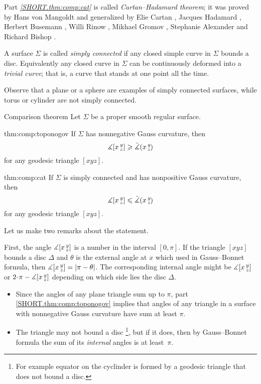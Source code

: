 Part \textit{\ref{SHORT.thm:comp:cat}} is called \emph{Cartan--Hadamard theorem};
it was proved by 
Hans von Mangoldt \cite{mangoldt} and generalized by Elie Cartan \cite{cartan}, Jacques Hadamard \cite{hadamard},
Herbert Busemann \cite{busemann},
Willi Rinow \cite{rinow},
Mikhael Gromov \cite[p.~119]{gromov},
Stephanie Alexander and Richard Bishop \cite{a-b:h-c}.

A surface $\Sigma$ is called \emph{simply connected} if any closed simple curve in $\Sigma$ bounds a disc.
Equivalently any closed curve in $\Sigma$ can be continuously deformed into a \emph{trivial curve}; that is, a curve that stands at one point all the time.

Observe that a plane or a sphere are examples of simply connected surfaces, while torus or cylinder are not simply connected.


\begin{thm}{Comparison theorem}\label{thm:comp}
Let $\Sigma$ be a proper smooth regular surface.

\begin{subthm}{thm:comp:toponogov}
If $\Sigma$ has nonnegative Gauss curvature, then 
 \[\measuredangle[x\,{}^{y}_{z}]\geqslant\tilde\measuredangle(x\,{}^{y}_{z}\hspace{-0.2ex})\]
for any geodesic triangle $[xyz]$.
\end{subthm}

\begin{subthm}{thm:comp:cat}
If $\Sigma$ is simply connected and has nonpositive Gauss curvature,
 then 
\[\measuredangle[x\,{}^{y}_{z}]\leqslant\tilde\measuredangle(x\,{}^{y}_{z}\hspace{-0.2ex})\]
for any geodesic triangle $[xyz]$.
\end{subthm}

\end{thm}


Let us make two remarks about the statement.

First, the angle $\measuredangle[x\,{}^{y}_{z}]$ is a number in the interval $[0,\pi]$.
If the triangle $[xyz]$ bounds a disc $\Delta$ and $\theta$ is the external angle at  $x$ which used in Gauss--Bonnet formula, 
then $\measuredangle[x\,{}^{y}_{z}]=|\pi-\theta|$.
The corresponding internal angle might be $\measuredangle[x\,{}^{y}_{z}]$ or $2\cdot\pi-\measuredangle\hinge {x}{y}{z}$ depending on which side lies the disc $\Delta$.

\begin{itemize}
\item Since the angles of any plane triangle sum up to $\pi$,
part \ref{SHORT.thm:comp:toponogov} implies that angles of any triangle in a surface with nonnegative Gauss curvature have sum at least $\pi$.

\item The triangle may not bound a disc%
\footnote{For example equator on the cyclinder is formed by a geodesic triangle that does not bound a disc.}, but  if it does, then by Gauss--Bonnet formula the sum of its {}\emph{internal} angles is at least~$\pi$.
\end{itemize}

